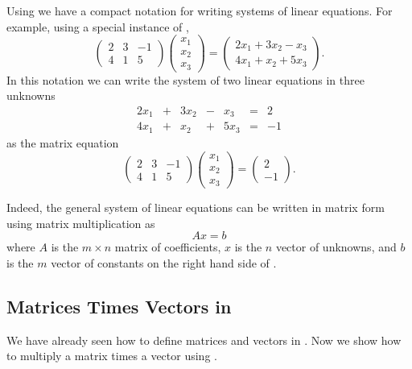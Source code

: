 Using  we have a compact notation for writing
systems of linear equations.  For example, using a special
instance of ,
\[
\left(
\begin{array}{rrr}
 2  & 3 & -1 \\
 4  & 1 &  5
\end{array}
\right)
\left(
\begin{array}{r}
x_1 \\ x_2 \\ x_3
\end{array}
\right)
=
\left(
\begin{array}{c}
2x_1 + 3x_2 - x_3 \\
4x_1 + x_2 + 5x_3
\end{array}
\right).
\]
In this notation we can write the system of two linear equations
in three unknowns
\[
\begin{array}{ccccccr}
2x_1 & + & 3x_2 & - &  x_3 & = &   2 \\
4x_1 & + &  x_2 & + & 5x_3 & = &  -1
\end{array}
\]
as the matrix equation
\[
\left(
\begin{array}{rrr}
 2  & 3 & -1 \\
 4  & 1 &  5
\end{array}
\right)
\left(
\begin{array}{r}
x_1 \\ x_2 \\ x_3
\end{array}
\right)
=
\left(
\begin{array}{r}
2 \\ -1
\end{array}
\right).
\]

Indeed, the general system of linear equations 
can be written in matrix form using matrix multiplication as
\[
Ax=b
\]
where $A$ is the $m\times n$ matrix of coefficients, $x$ is the
$n$ vector of unknowns, and $b$ is the $m$ vector of constants
on the right hand side of .


\subsection*{Matrices Times Vectors in \Matlab}

We have already seen how to define matrices and vectors in
\Matlabp.  Now we show how to multiply a matrix times a vector
using \Matlabp{}.

